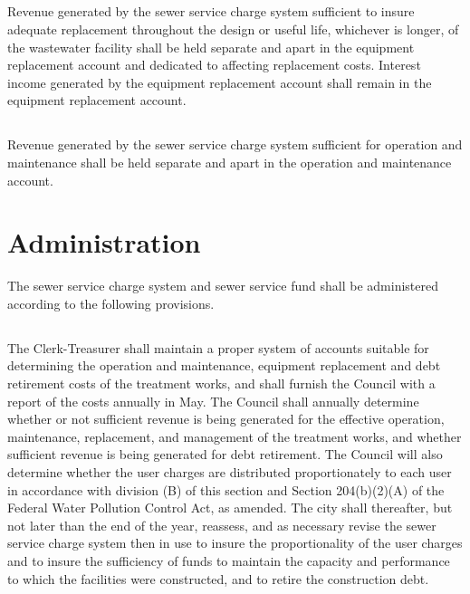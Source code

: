 \subsection{}
Revenue generated by the sewer service charge system sufficient to insure adequate replacement throughout the design or useful life, whichever is longer, of the wastewater facility shall be held separate and apart in the equipment replacement account and dedicated to affecting replacement costs.  Interest income generated by the equipment replacement account shall remain in the equipment replacement account.
\subsection{}
Revenue generated by the sewer service charge system sufficient for operation and maintenance shall be held separate and apart in the operation and maintenance account.

\section{Administration}
The sewer service charge system and sewer service fund shall be administered according to the following provisions.
\subsection{}
The Clerk-Treasurer shall maintain a proper system of accounts suitable for determining the operation and maintenance, equipment replacement and debt retirement costs of the treatment works, and shall furnish the Council with a report of the costs annually in May.  The Council shall annually determine whether or not sufficient revenue is being generated for the effective operation, maintenance, replacement, and management of the treatment works, and whether sufficient revenue is being generated for debt retirement. The Council will also determine whether the user charges are distributed proportionately to each user in accordance with division (B) of this section and Section 204(b)(2)(A) of the Federal Water Pollution Control Act, as amended. The city shall thereafter, but not later than the end of the year, reassess, and as necessary revise the sewer service charge system then in use to insure the proportionality of the user charges and to insure the sufficiency of funds to maintain the capacity and performance to which the facilities were constructed, and to retire the construction debt.
